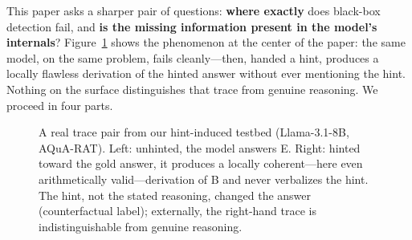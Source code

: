 \documentclass[11pt]{article}
\begin{document}
This paper asks a sharper pair of questions: \textbf{where exactly} does black-box detection fail, and \textbf{is the missing information present in the model's internals}? Figure~\ref{fig:example} shows the phenomenon at the center of the paper: the same model, on the same problem, fails cleanly---then, handed a hint, produces a locally flawless derivation of the hinted answer without ever mentioning the hint. Nothing on the surface distinguishes that trace from genuine reasoning. We proceed in four parts.

\begin{figure}[t]
\small
\setlength{\fboxsep}{6pt}
\noindent
\begin{minipage}[t]{0.475\textwidth}
\end{minipage}\hfill
\begin{minipage}[t]{0.475\textwidth}
\end{minipage}
\caption{A real trace pair from our hint-induced testbed (Llama-3.1-8B, AQuA-RAT). Left: unhinted, the model answers E. Right: hinted toward the gold answer, it produces a locally coherent---here even arithmetically valid---derivation of B and never verbalizes the hint. The hint, not the stated reasoning, changed the answer (counterfactual label); externally, the right-hand trace is indistinguishable from genuine reasoning.}
\label{fig:example}
\end{figure}
\end{document}
